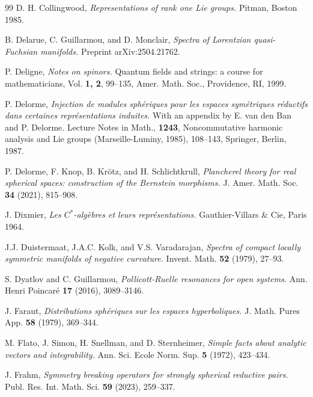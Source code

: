 \documentclass[10]{amsart}
\theoremstyle{remark}
\theoremstyle{definition}
\numberwithin{equation}{section}
\begin{document}
{\begin{thebibliography}{99}
 D. H. Collingwood,  {\em Representations of rank one Lie groups.} Pitman, Boston 1985.

 B. Delarue, C. Guillarmou, and D. Monclair, {\em Spectra of Lorentzian quasi-Fuchsian manifolds.} Preprint arXiv:2504.21762.

 P. Deligne, {\it Notes on spinors.} Quantum fields and strings: a course for mathematicians, Vol. {\bf 1, 2}, 99--135, Amer. Math. Soc., Providence, RI, 1999.  

 P. Delorme, {\it Injection de modules sph\'eriques pour les espaces sym\'etriques r\'eductifs dans certaines repr\'esentations induites.} 
With an appendix by E. van den Ban and P. Delorme. Lecture Notes in Math., {\bf 1243}, Noncommutative harmonic analysis and Lie groups (Marseille-Luminy, 1985), 
108--143, Springer, Berlin, 1987.

 P. Delorme, F. Knop, B. Kr\" otz, and H. Schlichtkrull, {\em Plancherel theory for real spherical spaces: construction of the Bernstein morphisms.}
 J. Amer. Math. Soc. {\bf 34}  (2021), 815--908.

 J. Dixmier,  {\em Les $C^*$-alg\`ebres et leurs repr\' esentations.} Gauthier-Villars \& Cie, Paris 1964.

 J.J. Duistermaat, J.A.C.  Kolk, and V.S. Varadarajan, {\it Spectra of compact locally symmetric manifolds of negative curvature.} Invent. Math. {\bf 52} (1979), 27--93.

 S. Dyatlov and C. Guillarmou, {\it Pollicott-Ruelle resonances for open systems.} Ann. Henri Poincar\' e {\bf 17} (2016), 3089--3146. 

 J. Faraut,  {\em Distributions sph\' eriques sur les espaces hyperboliques.} J. Math. Pures App. {\bf 58} (1979), 369--344.

 M. Flato, J. Simon, H. Snellman, and D. Sternheimer, {\it Simple facts about analytic vectors and integrability.} Ann. Sci. \'{ E}cole Norm. Sup. {\bf 5} (1972), 423--434. 

 J. Frahm, {\it Symmetry breaking operators for strongly spherical reductive pairs.}
Publ. Res. Int. Math. Sci. {\bf 59} (2023), 259--337.



\end{thebibliography}}
\end{document}
